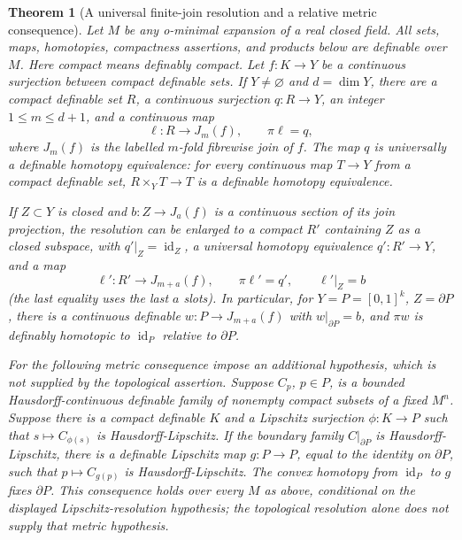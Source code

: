 \documentclass[11pt,a4paper]{article}
\newtheorem{theorem}{Theorem}[section]
\theoremstyle{definition}
\begin{document}
\begin{theorem}[A universal finite-join resolution and a relative metric consequence]\label{result-17}
Let \(M\) be any o-minimal expansion of a real closed field. All sets, maps, homotopies, compactness assertions, and products below are definable over \(M\). Here compact means definably compact. Let \(f:K\to Y\) be a continuous surjection between compact definable sets. If \(Y\ne\varnothing\) and \(d=\dim Y\), there are a compact definable set \(R\), a continuous surjection \(q:R\to Y\), an integer \(1\le m\le d+1\), and a continuous map
\begin{equation}
 \ell:R\longrightarrow J_m(f),\qquad \pi\ell=q,
 \label{equation-29}
\end{equation}
where \(J_m(f)\) is the labelled \(m\)-fold fibrewise join of \(f\). The map \(q\) is universally a definable homotopy equivalence: for every continuous map \(T\to Y\) from a compact definable set, \(R\times_YT\to T\) is a definable homotopy equivalence.

If \(Z\subset Y\) is closed and \(b:Z\to J_a(f)\) is a continuous section of its join projection, the resolution can be enlarged to a compact \(R'\) containing \(Z\) as a closed subspace, with \(q'|_Z=\operatorname{id}_Z\), a universal homotopy equivalence \(q':R'\to Y\), and a map
\begin{equation}
 \ell':R'\longrightarrow J_{m+a}(f),\qquad
 \pi\ell'=q',\qquad \ell'|_Z=b
 \label{equation-30}
\end{equation}
(the last equality uses the last \(a\) slots). In particular, for \(Y=P=[0,1]^k\), \(Z=\partial P\), there is a continuous definable \(w:P\to J_{m+a}(f)\) with \(w|_{\partial P}=b\), and \(\pi w\) is definably homotopic to \(\operatorname{id}_P\) relative to \(\partial P\).

For the following metric consequence impose an additional hypothesis, which is not supplied by the topological assertion. Suppose \(C_p\), \(p\in P\), is a bounded Hausdorff-continuous definable family of nonempty compact subsets of a fixed \(M^n\). Suppose there is a compact definable \(K\) and a Lipschitz surjection \(\phi:K\to P\) such that \(s\mapsto C_{\phi(s)}\) is Hausdorff-Lipschitz. If the boundary family \(C|_{\partial P}\) is Hausdorff-Lipschitz, there is a definable Lipschitz map \(g:P\to P\), equal to the identity on \(\partial P\), such that \(p\mapsto C_{g(p)}\) is Hausdorff-Lipschitz. The convex homotopy from \(\operatorname{id}_P\) to \(g\) fixes \(\partial P\). This consequence holds over every \(M\) as above, conditional on the displayed Lipschitz-resolution hypothesis; the topological resolution alone does not supply that metric hypothesis.
\end{theorem}
\end{document}

